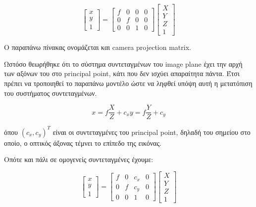 \begin{equation}
\begin{bmatrix}
x\\y\\1
\end{bmatrix}
=
\begin{bmatrix}
f & 0 & 0 & 0\\
0 & f & 0 & 0\\
0 & 0 & 1 & 0
\end{bmatrix}
\begin{bmatrix}
X\\
Y\\
Z\\
1
\end{bmatrix}
\end{equation}



Ο παραπάνω πίνακας ονομάζεται και camera projection matrix.



Ωστόσο θεωρήθηκε ότι το σύστημα συντεταγμένων του image plane έχει την αρχή των αξόνων του στο principal point, κάτι που δεν ισχύει απαραίτητα πάντα. Έτσι πρέπει να τροποιηθεί το παραπάνω μοντέλο ώστε να ληφθεί υπόψη αυτή η μετατόπιση του συστήματος συντεταγμένων.



\begin{equation}
x=f\frac{X}{Z}+c_{x} \! \!  y=f\frac{Y}{Z}+c_{y}
\end{equation}

όπου $(c_{x},c_{y})^{T}$ είναι οι συντεταγμένες του principal point, δηλαδή του σημείου στο οποίο, ο οπτικός άξονας τέμνει το επίπεδο της εικόνας. 

Οπότε και πάλι σε ομογενείς συντεταγμένες έχουμε:

\begin{equation}
\begin{bmatrix}
x\\y\\1
\end{bmatrix}
=
\begin{bmatrix}
f & 0 & c_{x} & 0\\
0 & f & c_{y} & 0\\
0 & 0 & 1 & 0
\end{bmatrix}
\begin{bmatrix}
X\\
Y\\
Z\\
1
\end{bmatrix}
\end{equation}

